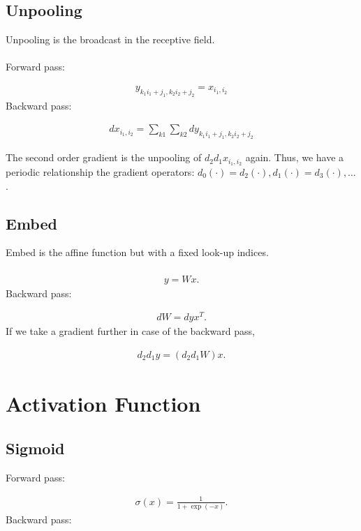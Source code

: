 \documentclass{article}
\begin{document}
\subsection{Unpooling}
Unpooling is the broadcast in the receptive field. \\ \\
%
Forward pass:

\begin{eqnarray}
  y_{k_1 i_1 + j_1, k_2 i_2 + j_2} = x_{i_1, i_2}
\end{eqnarray}
%
Backward pass:

\begin{eqnarray}
  dx_{i_1, i_2} = \sum_{k1} \sum_{k2} dy_{k_1 i_1 + j_1, k_2 i_2 + j_2}
\end{eqnarray}

The second order gradient is the unpooling of $d_2d_1 x_{i_1, i_2}$ again. Thus, we have a periodic relationship the gradient operators: $d_0(\cdot) = d_2(\cdot), d_1(\cdot) = d_3(\cdot), \ldots$.

\subsection{Embed}
Embed is the affine function but with a fixed look-up indices. \\ \\
%
\begin{eqnarray}
  y = Wx.
\end{eqnarray}
%
Backward pass:

\begin{eqnarray}
  dW = dy x^T.
\end{eqnarray}
%
If we take a gradient further in case of the backward pass,

\begin{eqnarray}
  d_2d_1 y = (d_2d_1 W) x.
\end{eqnarray}


\section{Activation Function}
\label{sec:Neural Network Activation Functions}

\subsection{Sigmoid}

Forward pass:

\begin{eqnarray}
  \sigma(x) = \frac{1}{1 + \exp(-x)}.
\end{eqnarray}
%
Backward pass:
\end{document}
